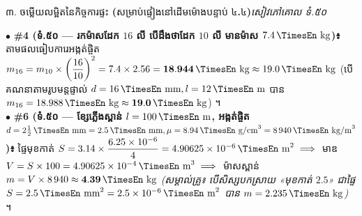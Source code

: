 \documentclass[a4paper,10pt]{article}
\newcommand{\en}[1]{{\TimesEn #1}}
\newcommand{\enbf}[1]{{\TimesEn\bfseries #1}}
\newcommand{\unit}[1]{\,\text{\en{#1}}}
\newcommand{\secstrip}[2]{%
  \vspace{3pt}%
  \begin{tcolorbox}[
    enhanced, sharp corners, colback=panelgray, colframe=black,
    boxrule=0.8pt, boxsep=0.8pt, top=2pt, bottom=2pt, left=5pt, right=5pt,
    after skip=3pt
  ]
    {\muol\fontsize{8.5pt}{12.2pt}\selectfont #1}\hfill{\fontsize{7.8pt}{10.8pt}\selectfont\textit{#2}}
  \end{tcolorbox}%
}
\begin{document}
\vspace{4pt}
\secstrip{៣. ចម្លើយលម្អិតនៃកិច្ចការផ្ទះ \enbf{(}សម្រាប់ផ្ទៀងនៅដើមម៉ោងបន្ទាប់ ៤\enbf{.}៤\enbf{)}}{សៀវភៅគោល ទំ.៥០}

\begin{tcolorbox}[
  enhanced, sharp corners, colback=white, colframe=black,
  boxrule=0.8pt, boxsep=2pt, top=4pt, bottom=4pt, left=6pt, right=6pt
]
  \fontsize{8.8pt}{13.2pt}\selectfont
  $\bullet$ \textbf{\#4 (ទំ.៥០ — រកម៉ាសដែក $16$ លី បើដឹងថាដែក $10$ លី មានម៉ាស $7.4\unit{kg}$)៖} តាមផលធៀបការេអង្កត់ផ្ចិត $m_{16} = m_{10}\times \left(\dfrac{16}{10}\right)^2 = 7.4\times 2.56 = \mathbf{18.944\unit{kg}} \approx 19.0\unit{kg}$ (បើគណនាតាមរូបមន្តផ្ទាល់ $d = 16\unit{mm}, l = 12\unit{m}$ បាន $m_{16} = 18.988\unit{kg} \approx \mathbf{19.0\unit{kg}}$) ។\\[2pt]
  $\bullet$ \textbf{\#6 (ទំ.៥០ — ខ្សែភ្លើងស្ពាន់ $l = 100\unit{m}$, អង្កត់ផ្ចិត $d = 2\frac{1}{2}\unit{mm} = 2.5\unit{mm}, \mu = 8.94\unit{g/cm}^3 = 8\,940\unit{kg/m}^3$)៖} ផ្ទៃមុខកាត់ $S = 3.14\times \dfrac{6.25\times 10^{-6}}{4} = 4.90625\times 10^{-6}\unit{m}^2 \implies$ មាឌ $V = S\times 100 = 4.90625\times 10^{-4}\unit{m}^3 \implies$ ម៉ាសស្ពាន់ $m = V\times 8\,940 \approx \mathbf{4.39\unit{kg}}$ \textit{(សម្គាល់គ្រូ៖ បើសិស្សបកស្រាយ «មុខកាត់ $2.5$» ជាផ្ទៃ $S = 2.5\unit{mm}^2 = 2.5\times 10^{-6}\unit{m}^2$ បាន $m = 2.235\unit{kg}$)} ។
\end{tcolorbox}
\end{document}
